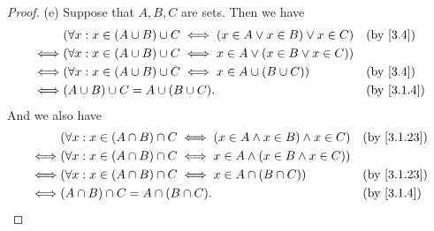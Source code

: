 \begin{proof}{(e)}
  Suppose that \(A, B, C\) are sets.
  Then we have
  \begin{align*}
         & (\forall x : x \in (A \cup B) \cup C \iff (x \in A \lor x \in B) \lor x \in C) &  & \text{(by \cref{3.4})} \\
    \iff & (\forall x : x \in (A \cup B) \cup C \iff x \in A \lor (x \in B \lor x \in C))                             \\
    \iff & (\forall x : x \in (A \cup B) \cup C \iff x \in A \cup (B \cup C))             &  & \text{(by \cref{3.4})} \\
    \iff & (A \cup B) \cup C = A \cup (B \cup C).                                         &  & \by{3.1.4}
  \end{align*}
  And we also have
  \begin{align*}
         & (\forall x : x \in (A \cap B) \cap C \iff (x \in A \land x \in B) \land x \in C) &  & \text{(by \cref{3.1.23})} \\
    \iff & (\forall x : x \in (A \cap B) \cap C \iff x \in A \land (x \in B \land x \in C))                                \\
    \iff & (\forall x : x \in (A \cap B) \cap C \iff x \in A \cap (B \cap C))               &  & \text{(by \cref{3.1.23})} \\
    \iff & (A \cap B) \cap C = A \cap (B \cap C).                                           &  & \by{3.1.4}
  \end{align*}
\end{proof}

